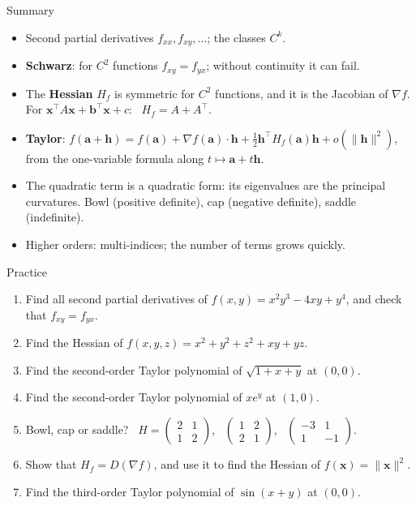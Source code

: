 \documentclass[10pt]{wosm-slides}
\newcommand{\norm}[1]{\lVert #1 \rVert}
\newcommand{\vx}{\mathbf{x}}
\newcommand{\va}{\mathbf{a}}
\newcommand{\vb}{\mathbf{b}}
\newcommand{\vh}{\mathbf{h}}
\begin{document}
\begin{frame}{Summary}
  \begin{itemize}
    \item Second partial derivatives $f_{xx}, f_{xy}, \dots$; the classes $C^k$.
    \item \textbf{Schwarz}: for $C^2$ functions $f_{xy} = f_{yx}$; without continuity it can fail.
    \item The \textbf{Hessian} $H_f$ is symmetric for $C^2$ functions, and it is the Jacobian of
      $\nabla f$. For $\vx^\top A\vx + \vb^\top\vx + c$: \ $H_f = A + A^\top$.
    \item \textbf{Taylor}: $f(\va + \vh) = f(\va) + \nabla f(\va)\cdot\vh + \frac12 \vh^\top H_f(\va)\vh + o(\norm{\vh}^2)$,
      from the one-variable formula along $t \mapsto \va + t\vh$.
    \item The quadratic term is a quadratic form: its eigenvalues are the principal curvatures.
      Bowl (positive definite), cap (negative definite), saddle (indefinite).
    \item Higher orders: multi-indices; the number of terms grows quickly.
  \end{itemize}
\end{frame}

\begin{frame}{Practice}
  \small
  \begin{enumerate}
    \item Find all second partial derivatives of $f(x, y) = x^2 y^3 - 4xy + y^4$, and check that
      $f_{xy} = f_{yx}$.
    \item Find the Hessian of $f(x, y, z) = x^2 + y^2 + z^2 + xy + yz$.
    \item Find the second-order Taylor polynomial of $\sqrt{1 + x + y}$ at $(0, 0)$.
    \item Find the second-order Taylor polynomial of $x e^y$ at $(1, 0)$.
    \item Bowl, cap or saddle? \
      $H = \begin{pmatrix} 2 & 1 \\ 1 & 2 \end{pmatrix}$, \
      $\begin{pmatrix} 1 & 2 \\ 2 & 1 \end{pmatrix}$, \
      $\begin{pmatrix} -3 & 1 \\ 1 & -1 \end{pmatrix}$.
    \item Show that $H_f = D(\nabla f)$, and use it to find the Hessian of $f(\vx) = \norm{\vx}^2$.
    \item Find the third-order Taylor polynomial of $\sin(x + y)$ at $(0, 0)$.
  \end{enumerate}
\end{frame}
\end{document}
